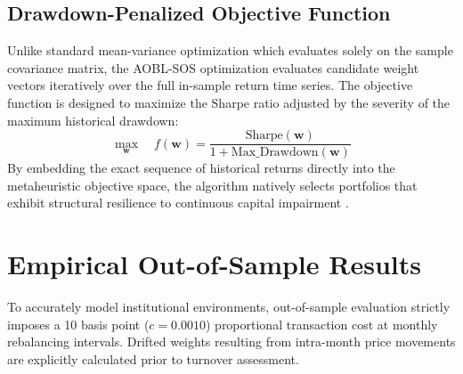 \documentclass[11pt,a4paper]{article}
\begin{document}
\subsection{Drawdown-Penalized Objective Function}
Unlike standard mean-variance optimization which evaluates solely on the sample covariance matrix, the AOBL-SOS optimization evaluates candidate weight vectors iteratively over the full in-sample return time series. The objective function is designed to maximize the Sharpe ratio adjusted by the severity of the maximum historical drawdown:
\begin{equation}
\max_{\mathbf{w}} \quad f(\mathbf{w}) = \frac{\text{Sharpe}(\mathbf{w})}{1 + \text{Max\_Drawdown}(\mathbf{w})}
\end{equation}
By embedding the exact sequence of historical returns directly into the metaheuristic objective space, the algorithm natively selects portfolios that exhibit structural resilience to continuous capital impairment \cite{chekhlov2005}.



\section{Empirical Out-of-Sample Results}

To accurately model institutional environments, out-of-sample evaluation strictly imposes a 10 basis point ($c = 0.0010$) proportional transaction cost at monthly rebalancing intervals. Drifted weights resulting from intra-month price movements are explicitly calculated prior to turnover assessment.

\begin{table}[htbp]
\centering
\caption{Net-of-Cost Benchmark Analysis ($K=30$ Cardinality, 10 bps Transaction Cost, Monthly Rebalancing, 2023-2025)}
\label{tab:master_benchmark}
\end{table}
\end{document}
